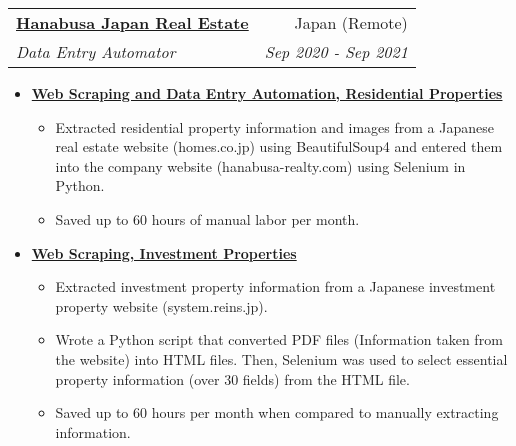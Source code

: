 \documentclass[letterpaper,11pt]{article}
\makeatletter
\newcommand{\resumeItem}[2]{
  \item\small{
    \textbf{#1}{ #2 \vspace{-2pt}}
  }
}
\newcommand{\resumeSubheading}[4]{
  \vspace{-1pt}\item
    \begin{tabular*}{0.97\textwidth}{l@{\extracolsep{\fill}}r}
      \textbf{#1} & #2 \\
      \textit{\small#3} & \textit{\small #4} \\
    \end{tabular*}\vspace{-5pt}
}
\newcommand{\resumeItemListStart}{\begin{itemize}}
\newcommand{\resumeItemListEnd}{\end{itemize}\vspace{-5pt}}
\makeatother
\begin{document}
    \resumeSubheading
      {\href{https://hanabusa-realty.com/}{Hanabusa Japan Real Estate}}{Japan (Remote)}
      {Data Entry Automator}{Sep 2020 - Sep 2021}
      \resumeItemListStart
        \resumeItem{\href{https://github.com/pl3lee/Hanabusa-Automation}{Web Scraping and Data Entry Automation, Residential Properties}}
        {\begin{itemize}
            \item Extracted residential property information and images from a Japanese real estate website (homes.co.jp) using BeautifulSoup4 and entered them into the company website (hanabusa-realty.com) using Selenium in Python.
            \item Saved up to 60 hours of manual labor per month.
        \end{itemize}}
        \resumeItem{\href{https://github.com/pl3lee/Reins-Automation}{Web Scraping, Investment Properties}}
        {\begin{itemize}
            \item Extracted investment property information from a Japanese investment property website (system.reins.jp).
            \item Wrote a Python script that converted PDF files (Information taken from the website) into HTML files. Then, Selenium was used to select essential property information (over 30 fields) from the HTML file.
            \item Saved up to 60 hours per month when compared to manually extracting information.
        \end{itemize}}
      \resumeItemListEnd

\end{document}
